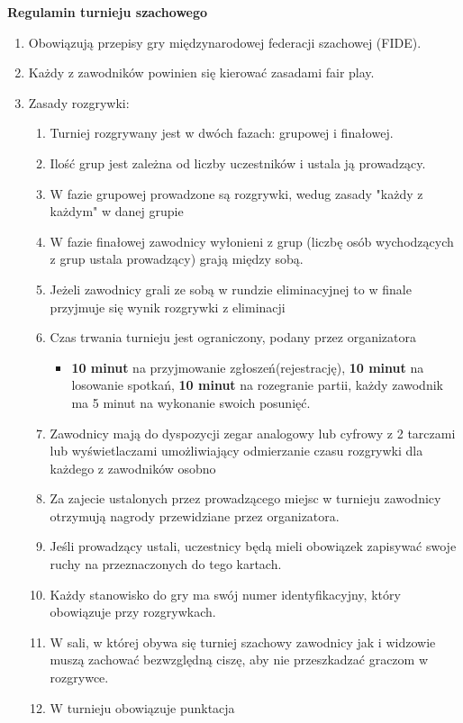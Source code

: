 \textbf{}
\vbox{
\centering	\noindent\textbf{\Huge Regulamin turnieju szachowego}\vspace{0.5cm}}\\
\begin{enumerate}
\item Obowiązują przepisy gry międzynarodowej federacji szachowej (FIDE).
\item Każdy z zawodników powinien się kierować zasadami fair play.
\item Zasady rozgrywki:
\begin{enumerate}
\item Turniej rozgrywany jest w dwóch fazach: grupowej i finałowej.
\item Ilość grup jest zależna od liczby uczestników i ustala ją prowadzący.
\item W fazie grupowej prowadzone są rozgrywki, wedug zasady "każdy z każdym" w danej grupie
\item W fazie finałowej zawodnicy wyłonieni z grup (liczbę osób wychodzących z grup ustala prowadzący) grają między sobą.
\item Jeżeli zawodnicy grali ze sobą w rundzie eliminacyjnej to w finale przyjmuje się wynik rozgrywki z eliminacji
\item Czas trwania turnieju jest ograniczony, podany przez organizatora
\begin{itemize}
\item \textbf{10 minut} na przyjmowanie zgłoszeń(rejestrację), \textbf{10 minut} na losowanie spotkań, \textbf{10 minut} na rozegranie partii, każdy zawodnik ma 5 minut na wykonanie swoich posunięć.
\end{itemize}
\item Zawodnicy mają do dyspozycji zegar analogowy lub cyfrowy z 2 tarczami lub wyświetlaczami umożliwiający odmierzanie czasu rozgrywki dla każdego z zawodników osobno
\item Za zajecie ustalonych przez prowadzącego miejsc w turnieju zawodnicy otrzymują nagrody przewidziane przez organizatora.
\item Jeśli prowadzący ustali, uczestnicy będą mieli obowiązek zapisywać swoje ruchy na przeznaczonych do tego kartach.
\item Każdy stanowisko do gry ma swój numer identyfikacyjny, który obowiązuje przy rozgrywkach.
\item W sali, w której obywa się turniej szachowy zawodnicy jak i widzowie muszą zachować bezwzględną ciszę, aby nie przeszkadzać graczom w rozgrywce.
\item W turnieju obowiązuje punktacja

\end{enumerate}
\end{enumerate}
